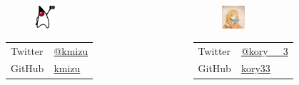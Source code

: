 \begin{frame}
  \begin{columns}
    \begin{column}{0.45\textwidth}
      \begin{center}
        \begin{figure}
          \includegraphics[width=0.2\textwidth]{img/kmizu.png}
        \end{figure}
      \end{center}
 
      \begin{table}[h]
        \begin{tabular}{ll}
          Twitter & \href{https://twitter.com/kmizu}{@kmizu} \\
          GitHub &  \href{https://github.com/kmizu}{kmizu} \\
        \end{tabular}
      \end{table}
    \end{column}
    \begin{column}{0.45\textwidth}
      \begin{center}
        \begin{figure}
          \includegraphics[width=0.2\textwidth]{img/kory.png}
        \end{figure}
      \end{center}
 
      \begin{table}[h]
        \begin{tabular}{ll}
          Twitter & \href{https://twitter.com/kory\_\_3}{@kory\_\_3} \\
          GitHub &  \href{https://github.com/kory33}{kory33} \\
        \end{tabular}
      \end{table}
    \end{column}
  \end{columns}


\end{frame}
